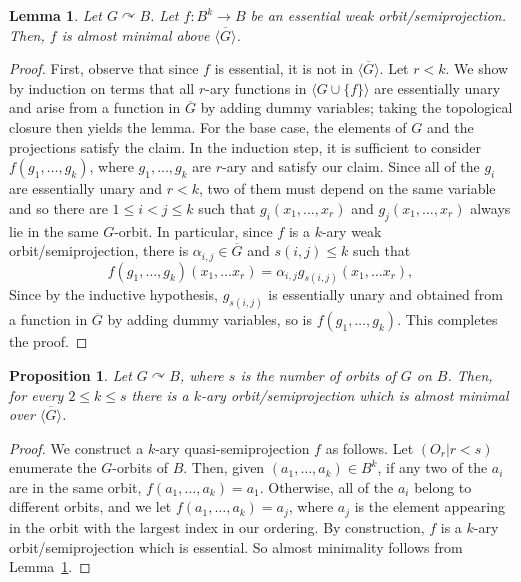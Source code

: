 \documentclass{article}
\newtheorem{lemma}[theorem]{Lemma}
\newtheorem{prop}[theorem]{Proposition}
\theoremstyle{remark}
\theoremstyle{definition}
\def\acts{\curvearrowright}
\begin{document}
\begin{lemma}\label{lem:collapse} Let $G\acts B$. Let $f:B^k\to B$ be an essential weak orbit\-/semiprojection. Then, $f$ is almost minimal above $\overline{\langle G\rangle}$.
\end{lemma}
\begin{proof} First, observe that since $f$ is  essential, it is not in $\overline{\langle G\rangle}$. Let $r< k$. We show by induction on terms that all $r$-ary functions in $\langle G \cup \{f\}\rangle$ are essentially unary and arise from a function in $\overline{G}$ by adding dummy variables; taking the topological closure then yields the lemma. For the base case, the elements of $G$ and the projections satisfy the claim. In the induction step, it is sufficient to consider $f(g_1,\dots ,g_k)$, where $g_1,\dots ,g_k$ are $r$-ary and satisfy our claim. Since all of the $g_i$ are essentially unary and $r<k$, two of them must depend on the same variable and so there are $1\leq i<j\leq k$ such that $g_i(x_1, \dots, x_{r})$ and $g_j(x_1, \dots, x_r)$ always lie in the same $G$-orbit. In particular, since $f$ is a $k$-ary weak orbit\-/semiprojection, there is $\alpha_{i,j}\in \overline{G}$ and $s(i,j)\leq k$ such that
  \[f(g_1, \dots, g_k)(x_1, \dots x_{r})=\alpha_{i,j}g_{s(i,j)}(x_1, \dots x_{r}),\]
Since by the inductive hypothesis, $g_{s(i,j)}$ is essentially unary and obtained from a function in $\overline G$ by adding dummy variables, so is $f(g_1, \dots, g_k)$. This completes the proof.
\end{proof}




\begin{prop}\label{prop:exproj} Let $G\acts B$, where $s$ is the number of orbits of $G$ on $B$. Then, for every $2\leq k\leq s$ there is a $k$-ary orbit\-/semiprojection which is almost minimal over $\overline{\langle G \rangle}$. 
\end{prop}
\begin{proof}
    We construct a $k$-ary quasi-semiprojection $f$ as follows. Let $(O_r|r<s)$ enumerate the $G$-orbits of $B$. Then, given $(a_1, \dots, a_k)\in B^k$, if any two of the $a_i$ are in the same orbit, $f(a_1, \dots, a_k)=a_1$. Otherwise, all of the $a_i$ belong to different orbits, and we let $f(a_1, \dots, a_k)=a_j$, where $a_j$ is the element appearing in the orbit with the largest index in our ordering. By construction, $f$ is a $k$-ary orbit\-/semiprojection which is essential. So almost minimality follows from Lemma~\ref{lem:collapse}.
\end{proof}
\end{document}
